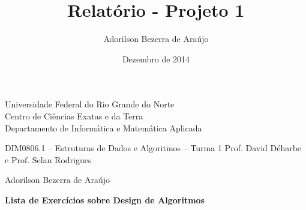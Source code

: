 \documentclass[12pt]{article}
\title{Relatório - Projeto 1}
\author{Adorilson Bezerra de Araújo}
\date{Dezembro de 2014}
\begin{document}
\begin{center}
{\large\sc Universidade Federal do Rio Grande do Norte} \\
{\large\sc Centro de Ciências Exatas e da Terra} \\
{\large\sc Departamento de Informática e Matemática Aplicada}

\vspace*{0.5cm}

{\sc DIM0806.1 -- Estruturas de Dados e Algoritmos -- Turma 1}
{\sc Prof. David Déharbe e Prof. Selan Rodrigues}

\vspace*{0.2cm}

{\sc Adorilson Bezerra de Araújo}

\vspace*{0.2cm}

{\bf Lista de Exercícios sobre Design de Algoritmos}
\end{center}








\end{document}
